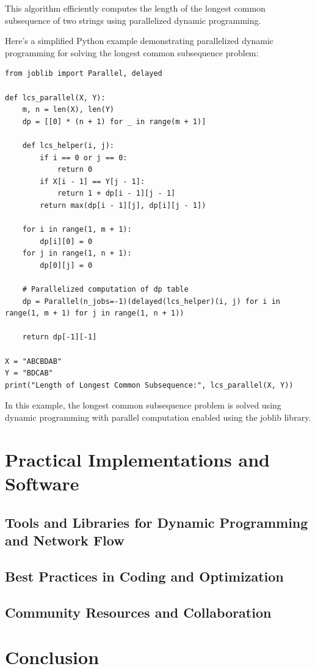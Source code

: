 \documentclass[12pt]{book} %
\begin{document}
This algorithm efficiently computes the length of the longest common subsequence of two strings using parallelized dynamic programming.

Here's a simplified Python example demonstrating parallelized dynamic programming for solving the longest common subsequence problem:
\FloatBarrier
\begin{lstlisting}
from joblib import Parallel, delayed

def lcs_parallel(X, Y):
    m, n = len(X), len(Y)
    dp = [[0] * (n + 1) for _ in range(m + 1)]
    
    def lcs_helper(i, j):
        if i == 0 or j == 0:
            return 0
        if X[i - 1] == Y[j - 1]:
            return 1 + dp[i - 1][j - 1]
        return max(dp[i - 1][j], dp[i][j - 1])
    
    for i in range(1, m + 1):
        dp[i][0] = 0
    for j in range(1, n + 1):
        dp[0][j] = 0
    
    # Parallelized computation of dp table
    dp = Parallel(n_jobs=-1)(delayed(lcs_helper)(i, j) for i in range(1, m + 1) for j in range(1, n + 1))
    
    return dp[-1][-1]

X = "ABCBDAB"
Y = "BDCAB"
print("Length of Longest Common Subsequence:", lcs_parallel(X, Y))
\end{lstlisting}
\FloatBarrier
In this example, the longest common subsequence problem is solved using dynamic programming with parallel computation enabled using the joblib library.

\section{Practical Implementations and Software}
\subsection{Tools and Libraries for Dynamic Programming and Network Flow}
\subsection{Best Practices in Coding and Optimization}
\subsection{Community Resources and Collaboration}

\section{Conclusion}
\end{document}

